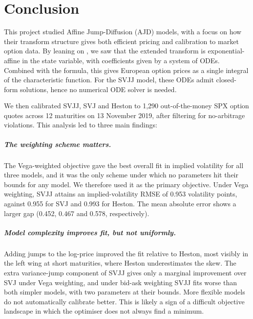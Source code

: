 \chapter{Conclusion}
\label{ch:conclusion}

This project studied Affine Jump-Diffusion (AJD) models, with a focus on how their transform
structure gives both efficient pricing and calibration to market option data. 
By leaning on \parencite{Duffie2000}, we saw that the extended transform is exponential-affine in
the state variable, with coefficients given by a system of ODEs. Combined with the
\parencite{Lewis2001} formula, this gives European option prices as a single integral of the
characteristic function. For the SVJJ model, these ODEs admit closed-form solutions, hence no
numerical ODE solver is needed. 

We then calibrated SVJJ, SVJ and Heston to 1,290 out-of-the-money SPX option quotes across 12
maturities on 13 November 2019, after filtering for no-arbitrage violations. This analysis led to
three main findings:

\paragraph{The weighting scheme matters.}
The Vega-weighted objective gave the best overall fit in implied volatility for all three models,
and it was the only scheme under which no parameters hit their bounds for any model. We therefore
used it as the primary objective. Under Vega weighting, SVJJ attains an implied-volatility RMSE of
0.953 volatility points, against 0.955 for SVJ and 0.993 for Heston. The mean absolute error shows a
larger gap (0.452, 0.467 and 0.578, respectively).

\paragraph{Model complexity improves fit, but not uniformly.}
Adding jumps to the log-price improved the fit relative to Heston, most visibly in the left wing at
short maturities, where Heston underestimates the skew. The extra variance-jump component
of SVJJ gives only a marginal improvement over SVJ under Vega weighting, and under bid-ask weighting
SVJJ fits worse than both simpler models, with two parameters at their bounds. More flexible models
do not automatically calibrate better. This is likely a sign of a difficult objective landscape in
which the optimiser does not always find a minimum.

